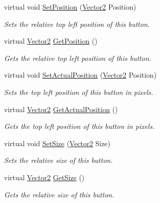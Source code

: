\begin{DoxyCompactItemize}
virtual void \hyperlink{classphys_1_1UI_1_1TextButton_a57f8955e357e9e55e339237a91d8c209}{SetPosition} (\hyperlink{classphys_1_1Vector2}{Vector2} Position)
\begin{DoxyCompactList}\small\item\em Sets the relative top left position of this button. \item\end{DoxyCompactList}\item 
virtual \hyperlink{classphys_1_1Vector2}{Vector2} \hyperlink{classphys_1_1UI_1_1TextButton_a09768e0666a109b7d35fd8b78240cfd3}{GetPosition} ()
\begin{DoxyCompactList}\small\item\em Gets the relative top left position of this button. \item\end{DoxyCompactList}\item 
virtual void \hyperlink{classphys_1_1UI_1_1TextButton_ab459720bb401b99ebc4a5287e36a91ee}{SetActualPosition} (\hyperlink{classphys_1_1Vector2}{Vector2} Position)
\begin{DoxyCompactList}\small\item\em Sets the top left position of this button in pixels. \item\end{DoxyCompactList}\item 
virtual \hyperlink{classphys_1_1Vector2}{Vector2} \hyperlink{classphys_1_1UI_1_1TextButton_ab406bec58bf6244c3e867fefd19d4d7f}{GetActualPosition} ()
\begin{DoxyCompactList}\small\item\em Gets the top left position of this button in pixels. \item\end{DoxyCompactList}\item 
virtual void \hyperlink{classphys_1_1UI_1_1TextButton_a04a27287b038220fa8183079c1a727ec}{SetSize} (\hyperlink{classphys_1_1Vector2}{Vector2} Size)
\begin{DoxyCompactList}\small\item\em Sets the relative size of this button. \item\end{DoxyCompactList}\item 
virtual \hyperlink{classphys_1_1Vector2}{Vector2} \hyperlink{classphys_1_1UI_1_1TextButton_a21f1ff24070711e5a42eae4eb54d02d6}{GetSize} ()
\begin{DoxyCompactList}\small\item\em Gets the relative size of this button. \item\end{DoxyCompactList}\item 

\end{DoxyCompactItemize}

